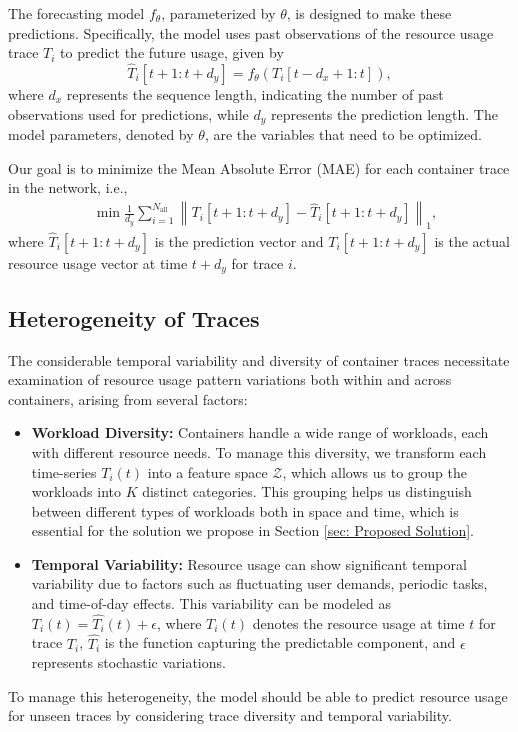 The forecasting model $f_\theta$, parameterized by $\theta$, is designed to make these predictions. Specifically, the model uses past observations of the resource usage trace $T_i$ to predict the future usage, given by
\begin{equation}
    \hat{T}_i[t + 1:t + d_y] = f_\theta\left(T_i[t - d_x + 1:t]\right),
\end{equation}
where $d_x$ represents the sequence length, indicating the number of past observations used for predictions, while $d_y$ represents the prediction length. The model parameters, denoted by $\theta$, are the variables that need to be optimized.

Our goal is to minimize the Mean Absolute Error (MAE) for each container trace in the network, i.e.,
\begin{align}
    &\min \frac{1}{d_y} \sum_{i=1}^{N_{\text{all}}} \left\| T_i[t + 1:t + d_y] - \hat{T}_i[t + 1:t + d_y] \right\|_1,
\end{align}
where $\hat{T}_i[t + 1:t + d_y]$ is the prediction vector and $T_i[t + 1:t + d_y]$ is the actual resource usage vector at time $t + d_y$ for trace $i$.

\subsection{Heterogeneity of Traces}
\label{sec: Container Trace Heterogeneity}

The considerable temporal variability and diversity of container traces necessitate examination of resource usage pattern variations both within and across containers, arising from several factors:

\begin{itemize}
    \item \textbf{Workload Diversity:} Containers handle a wide range of workloads, each with different resource needs. To manage this diversity, we transform each time-series $T_i(t)$ into a feature space $\mathcal{Z}$, which allows us to group the workloads into $K$ distinct categories. This grouping helps us distinguish between different types of workloads both in space and time, which is essential for the solution we propose in Section \ref{sec: Proposed Solution}.
    
    \item \textbf{Temporal Variability:} Resource usage can show significant temporal variability due to factors such as fluctuating user demands, periodic tasks, and time-of-day effects. This variability can be modeled as $T_i(t) = \hat{T_i}(t) + \epsilon$, where $T_i(t)$ denotes the resource usage at time $t$ for trace $T_i$, $\hat{T_i}$ is the function capturing the predictable component, and $\epsilon$ represents stochastic variations.
\end{itemize}

To manage this heterogeneity, the model should be able to predict resource usage for unseen traces by considering trace diversity and temporal variability.
